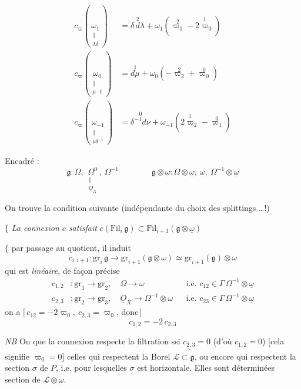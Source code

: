 \documentclass[11pt,a4paper]{article}
\begin{document}
\[
\begin{aligned}
c_{\varpi}(\underset{\substack{\|\\ \lambda\delta}}{\omega_1}) &= \overset{2}{\delta\,d\lambda} + \omega_1(\overset{2}{\varpi_1} - \overset{1}{2\varpi_0})\\
c_{\varpi}(\underset{\substack{\|\\ \mu\cdot 1}}{\omega_0}) &= \overset{1}{d\mu} + \omega_0(-\overset{2}{\varpi_2} + \overset{0}{\varpi_0})\\
c_{\varpi}(\underset{\substack{\|\\ \nu\delta^{-1}}}{\omega_{-1}}) &= \overset{0}{\delta^{-1}d\nu} + \omega_{-1}(\overset{1}{2\varpi_2} - \overset{0}{\varpi_1})
\end{aligned}
\]

Encadré :
\[
\mathfrak{g} : \Omega,\ \underset{\substack{\|\\ \underline{O}_X}}{\Omega^0},\ \Omega^{-1}
\qquad\qquad
\mathfrak{g}\otimes\underline{\omega} : \Omega\otimes\underline{\omega},\ \underline{\omega},\ \Omega^{-1}\otimes\underline{\omega}
\]

On trouve la condition suivante (indépendante du choix des splittings \ldots !)

$\{$ \emph{La connexion $c$ satisfait} $c(\mathrm{Fil}_i\,\mathfrak{g}) \subset \mathrm{Fil}_{i+1}(\mathfrak{g}\otimes\underline{\omega})$

$\{$ par passage au quotient, il induit
\[
c_{i,i+1} : \mathrm{gr}_i\,\mathfrak{g} \to \mathrm{gr}_{i+1}(\mathfrak{g}\otimes\omega) \simeq \mathrm{gr}_{i+1}(\mathfrak{g})\otimes\omega
\]
qui est \emph{linéaire}, de façon précise
\[
\begin{aligned}
c_{1,2} &: \mathrm{gr}_1 \to \mathrm{gr}_2,\quad \Omega \to \omega && \text{i.e. } c_{12} \in \Gamma\,\Omega^{-1}\otimes\underline{\omega}\\
c_{2,3} &: \mathrm{gr}_2 \to \mathrm{gr}_3,\quad \underline{O}_X \to \Omega^{-1}\otimes\omega && \text{i.e. } c_{23} \in \Gamma\,\Omega^{-1}\otimes\underline{\omega}
\end{aligned}
\]
on a $[\,c_{12} = -2\varpi_0,\ c_{2,3} = \varpi_0$, donc$\,]$
\[
\boxed{c_{1,2} = -2\,c_{2,3}}
\]

\emph{NB} On  que la connexion respecte la filtration ssi $\underset{\sim}{c_{2,3}} = 0$ (d'où $c_{1,2} = 0$) [cela signifie $\varpi_0 = 0$] \struck{\ill{}}  celles qui respectent la Borel $\mathcal{L}\subset\mathfrak{g}$, ou encore \struck{\ill{}} qui respectent la section $\sigma$ de $P$, i.e. pour lesquelles $\sigma$ est horizontale. Elles sont déterminées  section de $\mathcal{L}\otimes\underline{\omega}$.
\end{document}
